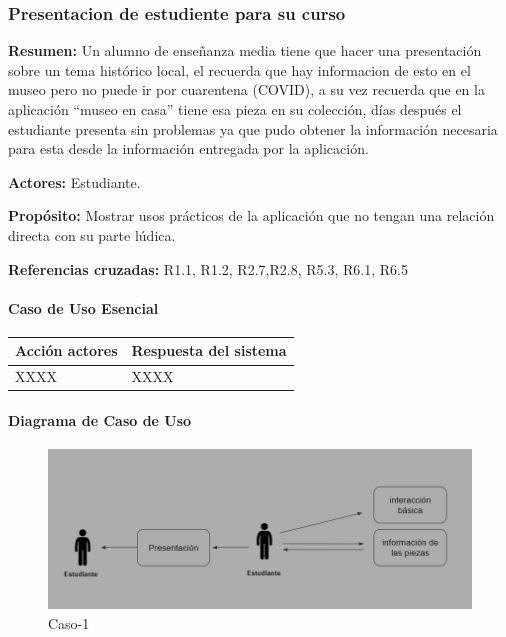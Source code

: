 \subsubsection{Presentacion de estudiente para su curso}

{\textbf {Resumen:}}
Un alumno de enseñanza media tiene que hacer una presentación sobre un tema histórico local, el recuerda que hay informacion de esto en el museo pero no puede ir por cuarentena (COVID), a su vez recuerda que en la aplicación “museo en casa” tiene esa pieza en su colección, días después el estudiante presenta sin problemas ya que pudo obtener la información necesaria para esta desde la información entregada por la aplicación.

{\textbf {Actores:}}
Estudiante.

{\textbf {Propósito:}}
Mostrar usos prácticos de la aplicación que no tengan una relación directa con su parte lúdica.

{\textbf {Referencias cruzadas:}}
R1.1, R1.2, R2.7,R2.8, R5.3, R6.1, R6.5

\paragraph{Caso de Uso Esencial}

\begin{longtable}{|p{5cm}|p{8cm}|}
\hline 
Acción actores & Respuesta del sistema \\ 
\hline 
XXXX & XXXX \\ 
\hline 
\end{longtable}

\paragraph{Diagrama de Caso de Uso}

\begin{figure}[H]
\centerline{\includegraphics[width=15cm]{imgs/CasoUso_4.PNG}}
\caption{Caso-1}
\label{fig}
\end{figure}

